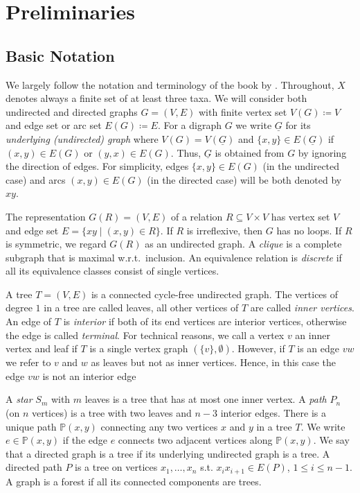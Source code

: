 \documentclass[smallextended]{svjour3}
\newcommand{\rev}[1]{\begingroup\color{blue}#1\endgroup}
\begin{document}
\section{Preliminaries}
\label{sec:prelim}

\subsection{Basic Notation} 

We largely follow the notation and terminology of \rev{the book by}
\citet{sem-ste-03a}. Throughout, $X$ denotes always a finite set of at
least three taxa. We will consider both undirected and directed graphs
$G=(V,E)$ with finite vertex set $V(G)\coloneqq V$ and edge set or arc set
$E(G)\coloneqq E$.  For a digraph $G$ we write $\underline{G}$ for its
\emph{underlying (undirected) graph} where $V(G)=V(\underline{G})$ and
$\{x,y\}\in E(\underline{G})$ if $(x,y)\in E(G)$ or $(y,x)\in E(G)$. Thus,
$\underline{G}$ is obtained from $G$ by ignoring the direction of edges.
For simplicity, edges $\{x,y\}\in E(G)$ (in the undirected case) and arcs
$(x,y)\in E(G)$ (in the directed case) will be both denoted by $xy$.

The representation $G(R)=(V,E)$ of a relation $R\subseteq V\times V$ has
vertex set $V$ and edge set $E=\{xy\mid (x,y)\in R\}$. If $R$ is
irreflexive, then $G$ has no loops. If $R$ is symmetric, we regard $G(R)$
as an undirected graph. A \emph{clique} is a complete subgraph that is
maximal w.r.t.\ inclusion. An equivalence relation is \emph{discrete} if
all its equivalence classes consist of single vertices.

A tree $T=(V,E)$ is a connected cycle-free undirected graph.  The vertices
of degree $1$ in a tree are called leaves, all other vertices of $T$ are
called \emph{inner vertices}. 
An edge of $T$ is \emph{interior} if both of
its end vertices are interior vertices, otherwise the edge is called \emph{terminal}.
\rev{For technical reasons, we call a vertex $v$ an inner vertex and leaf
if $T$ is a single vertex graph
$(\{v\},\emptyset)$. However, if 
$T$ is an edge $vw$ we refer to $v$ and $w$ as leaves but not
as inner vertices. Hence, in this case the edge $vw$ is not an
interior edge}


A \emph{star} $S_m$ with $m$ leaves
is a tree that has at most one inner vertex. A \emph{path} $P_n$ (on $n$
vertices) is a tree with two leaves and $n-3$ interior edges.  There is a
unique path $\mathbb{P}(x,y)$ connecting any two vertices $x$ and $y$ in a
tree $T$. We write $e\in\mathbb{P}(x,y)$ if the edge $e$ connects two
adjacent vertices along $\mathbb{P}(x,y)$.  We say that a directed graph is
a tree if its underlying undirected graph is a tree.  A directed path $P$
is a tree on vertices $x_1,\dots,x_n$ s.t. $x_ix_{i+1}\in E(P)$, $1\leq
i\leq n-1$. A graph is a forest if all its connected components are trees.
\end{document}
